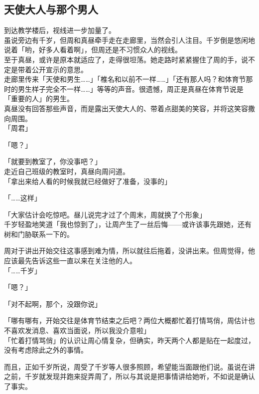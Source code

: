 \subsection{天使大人与那个男人}

到达教学楼后，视线进一步加量了。\\

虽说旁边有千岁，但周和真昼牵手走在走廊里，当然会引人注目。千岁倒是悠闲地说着「哟，好多人看着啊」，但周还是不习惯众人的视线。\\

至于真昼，或许是原本就适应了，走得很坦荡。她走路时紧紧握住了周的手，说不定是带着公开宣示的意思。\\

走廊里传来「天使和男生……」「椎名和以前不一样……」「还有那人吗？和体育节那时的男生样子完全不一样……」等等的声音。很遗憾，周正是真昼在体育节说是「重要的人」的男生。\\

真昼没有回答那些声音，而是露出天使大人的、带着点甜美的笑容，并将这笑容撒向周围。\\

「周君」

「嗯？」

「就要到教室了，你没事吧？」\\

走近自己班级的教室时，真昼向周问道。\\

「拿出来给人看的时候我就已经做好了准备，没事的」

「……这样」

「大家估计会吃惊吧。昼儿说完才过了个周末，周就换了个形象」\\

千岁轻盈地笑道「我也惊到了」，让周产生了一丝后悔——或许该事先跟她，还有树和门胁联系一下的。

周对于讲出开始交往这事感到难为情，所以就往后拖着，没讲出来。但周觉得，他应该最先告诉这些一直以来在关注他的人。\\

「……千岁」

「嗯？」

「对不起啊，那个，没跟你说」

「哪有哪有，开始交往是体育节结束之后吧？两位大概都忙着打情骂俏，周估计也不喜欢发消息、喜欢当面说，所以我没介意啦」\\

「忙着打情骂俏」的认识让周心情复杂，但确实，昨天两个人都是贴在一起度过，没有考虑除此之外的事情。

而且，正如千岁所说，周受了千岁等人很多照顾，希望能当面跟他们说。虽说在讲之前，千岁就发现并跑来捉弄周了，所以与其说是把事情讲给她听，不如说是确认了事实。\\

